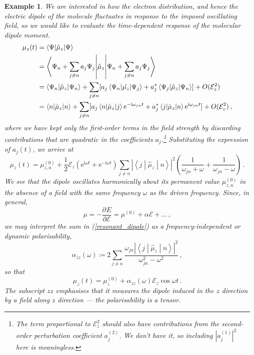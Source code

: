 \documentclass{article}
\theoremstyle{plain}\theoremheaderfont{\normalfont\itshape}\theorembodyfont{\rmfamily}\theoremseparator{.}\newtheorem*{rem}{Remark}\newtheorem*{ex}{Example}\newtheorem*{proof}{Proof}\newtheorem*{altp}{Alternative proof}
\theoremstyle{plain}\theoremheaderfont{\normalfont\bfseries}\theorembodyfont{\rmfamily}\theoremseparator{.}\newtheorem{thm}{Theorem}[section]\newtheorem{lem}[thm]{Lemma}\newtheorem{prop}[thm]{Proposition}\newtheorem*{cor}{Corollary}\newtheorem{defn}[thm]{Definition}\newtheorem{clm}[thm]{Claim}\newtheorem{clminproof}{Claim}
\theoremstyle{break}\theoremheaderfont{\normalfont\itshape}\theorembodyfont{\rmfamily}\theoremseparator{.\medskip}\newtheorem*{proofskip}{Proof}\newtheorem*{exs}{Examples}\newtheorem*{rems}{Remarks}
\theoremstyle{break}\theoremheaderfont{\normalfont\bfseries}\theorembodyfont{\rmfamily}\theoremseparator{.\medskip}\newtheorem{lemskip}[thm]{Lemma}\newtheorem{defnskip}[thm]{Definition}\newtheorem{propskip}[thm]{Proposition}\newtheorem{thmskip}[thm]{Theorem}
\numberwithin{equation}{section}
\newcommand{\ii}{\mathrm{i}}
\newcommand{\ee}{\mathrm{e}}
\newcommand{\pdv}[3][]{\frac{\partial^{#1} #2}{{\partial #3}^{#1}}}
\newcommand{\mel}[3]{\left\langle #1 \middle| #2 \middle| #3 \right\rangle}
\newcommand{\expval}[2]{\left\langle #2 \middle| #1 \middle| #2 \right\rangle}
\newcommand{\abs}[1]{\left| #1 \right|}
\begin{document}
\begin{ex}
        We are interested in how the electron distribution, and hence the electric dipole of the molecule fluctuates in response to the imposed oscillating field, so we would like to evaluate the time-dependent response of the molecular dipole moment.
        \begin{align}
            \mu_z(t)&=\expval{\hat{\mu}_z}{\Psi}\notag\\
            &=\expval{\hat{\mu}_z}{\Psi_n+\sum_{j\ne n}a_j\Psi_j}\notag \\
            &=\mel{\Psi_n}{\hat{\mu}_z}{\Psi_n}+\sum_{j\ne n}[a_j\mel{\Psi_n}{\hat{\mu_z}}{\Psi_j}+a_j^*\mel{\Psi_j}{\hat{\mu}_z}{\Psi_n}]+O(\mathcal{E}_z^2)\notag \\
            &=\expval{\hat{\mu}_z}{n}+\sum_{j\ne n}[a_j\mel{n}{\hat{\mu}_z}{j}\ee^{-\ii\omega_{jn}t}+a_j^*\mel{j}{\hat{\mu}_z}{n}\ee^{\ii\omega_{jn}t}]+O(\mathcal{E}_z^2)\,,
        \end{align}
        where we have kept only the first-order terms in the field strength by discarding contributions that are quadratic in the coefficients \(a_j\).\footnote{The term proportional to \(\mathcal{E}_z^2\) should also have contributions from the second-order perturbation coefficient \(a_j^{(2)}\). We don't have it, so including \(\abs{a_j^{(1)}}^2\) here is meaningless.} Substituting the expression of \(a_j(t)\), we arrive at
        \begin{equation}\label{resonant_dipole}
            \mu_z(t)=\mu_{z,n}^{(0)}+\frac{1}{2}\mathcal{E}_z(\ee^{\ii\omega t}+\ee^{-\ii\omega t})\sum_{j\ne n}\abs{\mel{j}{\hat{\mu}_z}{n}}^2\left(\frac{1}{\omega_{jn}+\omega}+\frac{1}{\omega_{jn}-\omega}\right)\,.
        \end{equation}
        We see that the dipole oscillates harmonically about its permanent value \(\mu_{z,n}^{(0)}\) in the absence of a field with the same frequency \(\omega\) as the driven frequency. Since, in general,
        \begin{equation}
            \mu=-\pdv{E}{\mathcal{E}}=\mu^{(0)}+\alpha\mathcal{E}+\dots\,,
        \end{equation}
        we may interpret the sum in (\ref{resonant_dipole}) as a \textit{frequency-independent} or \textit{dynamic polarisability},
        \begin{equation}\label{dynamic_polarisability}
            \alpha_{zz}(\omega)\coloneqq 2\sum_{j\ne n}\frac{\omega_{jn}\abs{\mel{j}{\hat{\mu}_z}{n}}^2}{\omega_{jn}^2-\omega^2}\,,
        \end{equation}
        so that
        \begin{equation}
            \mu_z(t)=\mu_z^{(0)}+\alpha_{zz}(\omega)\mathcal{E}_z\cos\omega t\,.
        \end{equation}
        The subscript \(zz\) emphasises that it measures the dipole induced in the \(z\) direction by a field along \(z\) direction --- the polarisability is a tensor.


\end{ex}
\end{document}
